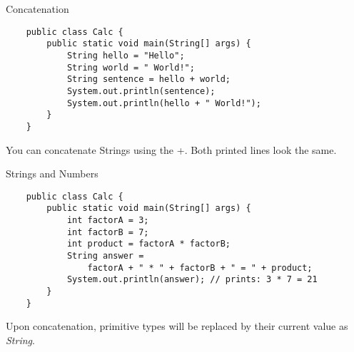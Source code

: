 \begin{frame}[fragile]{Concatenation}
	\begin{lstlisting}
	public class Calc {
	    public static void main(String[] args) {
	        String hello = "Hello";
	        String world = " World!";
	        String sentence = hello + world;
	        System.out.println(sentence);
	        System.out.println(hello + " World!");
	    }
	}
	\end{lstlisting}
	You can concatenate Strings using the +. Both printed lines look the same.
\end{frame}

\begin{frame}[fragile]{Strings and Numbers}
	\begin{lstlisting}
	public class Calc {
	    public static void main(String[] args) {
	    	int factorA = 3;
	    	int factorB = 7;
	    	int product = factorA * factorB;
	    	String answer =
	            factorA + " * " + factorB + " = " + product;
	        System.out.println(answer); // prints: 3 * 7 = 21
	    }
	}
	\end{lstlisting}
	Upon concatenation, primitive types will be replaced by their current value as \emph{String}.
\end{frame}


